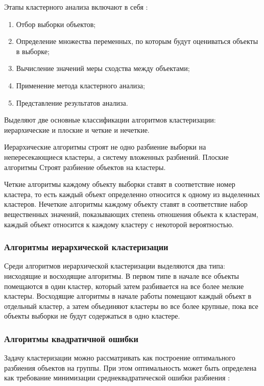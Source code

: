 Этапы кластерного анализа включают в себя \cite{clasters}:

\begin{enumerate}[leftmargin=1.6\parindent]
\item Отбор выборки объектов;
\item Определение множества переменных, по которым будут оцениваться объекты в выборке;
\item Вычисление значений меры сходства между объектами;
\item Применение метода кластерного анализа;
\item Представление результатов анализа.
\end{enumerate}

Выделяют две основные классификации алгоритмов кластеризации: \newline иерархические и плоские и четкие и нечеткие. \cite{clasters}

Иерархические алгоритмы строят не одно разбиение выборки на непересекающиеся кластеры, а систему вложенных разбиений. Плоские алгоритмы Строят разбиение объектов на кластеры. \cite{clasters}

Четкие алгоритмы каждому объекту выборки ставят в соответствие номер кластера, то есть каждый объект определенно относится к одному из выделенных кластеров. Нечеткие алгоритмы каждому объекту ставят в соответствие набор вещественных значений, показывающих степень отношения объекта к кластерам, каждый объект относится к каждому кластеру с некоторой вероятностью. \cite{clasters}

\subsubsection{Алгоритмы иерархической кластеризации}

Среди алгоритмов иерархической кластеризации выделяются два типа: нисходящие и восходящие алгоритмы. В первом типе в начале все объекты помещаются в один кластер, который затем разбивается на все более мелкие кластеры. Восходящие алгоритмы в начале работы помещают каждый объект в отдельный кластер, а затем объединяют кластеры во все более крупные, пока все объекты выборки не будут содержаться в одно кластере. \cite{clasters}

\subsubsection{Алгоритмы квадратичной ошибки}
Задачу кластеризации можно рассматривать как построение оптимального разбиения объектов на группы. При этом оптимальность может быть определена как требование минимизации среднеквадратической ошибки разбиения \cite{clasters}:

